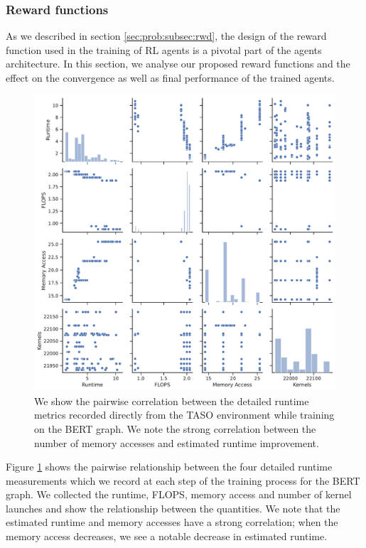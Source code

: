 \subsubsection{Reward functions}
\label{sec:eval:subsec:mf:subsubsec:rwd-func}

As we described in section \ref{sec:prob:subsec:rwd}, the design of the reward function used in the training of RL agents is a pivotal part of the agents architecture. In this section, we analyse our proposed reward functions and the effect on the convergence as well as final performance of the trained agents.

\begin{figure}[htbp]
  \centering
  \includegraphics[width=1\columnwidth]{sections/5evaluation/images/pairplot_bert.pdf}
  \caption[Pairwise plot of correlation between runtime metrics]{We show the pairwise correlation between the detailed runtime metrics recorded directly from the TASO environment while training on the BERT graph. We note the strong correlation between the number of memory accesses and estimated runtime improvement.}
  \label{fig:eval:pairplot-bert}
\end{figure}

Figure \ref{fig:eval:pairplot-bert} shows the pairwise relationship between the four detailed runtime measurements which we record at each step of the training process for the BERT graph. We collected the runtime, FLOPS, memory access and number of kernel launches and show the relationship between the quantities. We note that the estimated runtime and memory accesses have a strong correlation; when the memory access decreases, we see a notable decrease in estimated runtime. 

